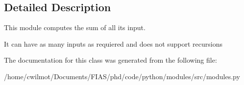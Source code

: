\subsection{Detailed Description}
This module computes the sum of all its input. 

It can have as many inputs as requiered and does not support recursions 

The documentation for this class was generated from the following file\+:\begin{DoxyCompactItemize}
\item 
/home/cwilmot/\+Documents/\+F\+I\+A\+S/phd/code/python/modules/src/modules.\+py\end{DoxyCompactItemize}
